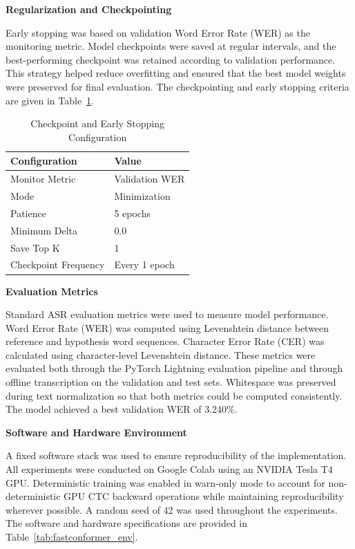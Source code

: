 \textbf{Regularization and Checkpointing}

Early stopping was based on validation Word Error Rate (WER) as the monitoring metric. Model checkpoints were saved at regular intervals, and the best-performing checkpoint was retained according to validation performance. This strategy helped reduce overfitting and ensured that the best model weights were preserved for final evaluation. The checkpointing and early stopping criteria are given in Table~\ref{tab:fastconformer_ckpt}.

\begin{table}[H]
\caption{Checkpoint and Early Stopping Configuration}
\label{tab:fastconformer_ckpt}
\centering
\begin{tabular}{|l|l|}
\hline
\textbf{Configuration} & \textbf{Value} \\
\hline
Monitor Metric & Validation WER \\
Mode & Minimization \\
Patience & 5 epochs \\
Minimum Delta & 0.0 \\
Save Top K & 1 \\
Checkpoint Frequency & Every 1 epoch \\
\hline
\end{tabular}
\end{table}

\textbf{Evaluation Metrics}

Standard ASR evaluation metrics were used to measure model performance. Word Error Rate (WER) was computed using Levenshtein distance between reference and hypothesis word sequences. Character Error Rate (CER) was calculated using character-level Levenshtein distance. These metrics were evaluated both through the PyTorch Lightning evaluation pipeline and through offline transcription on the validation and test sets. Whitespace was preserved during text normalization so that both metrics could be computed consistently. The model achieved a best validation WER of 3.240\%.

\textbf{Software and Hardware Environment}

A fixed software stack was used to ensure reproducibility of the implementation. All experiments were conducted on Google Colab using an NVIDIA Tesla T4 GPU. Deterministic training was enabled in warn-only mode to account for non-deterministic GPU CTC backward operations while maintaining reproducibility wherever possible. A random seed of 42 was used throughout the experiments. The software and hardware specifications are provided in Table~\ref{tab:fastconformer_env}.

